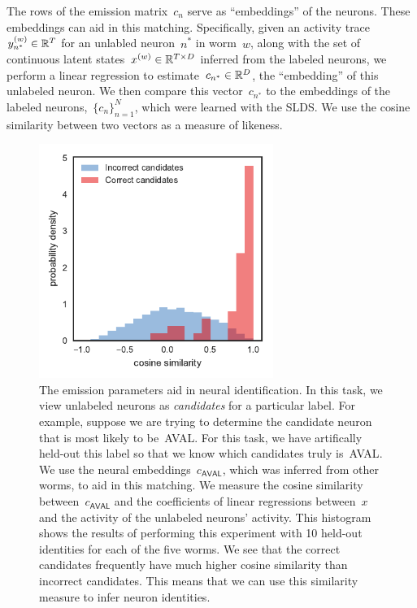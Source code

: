 \documentclass{article}
\begin{document}
The rows of the emission matrix~$c_n$ serve as ``embeddings'' of the
neurons. These embeddings can aid in this matching.  Specifically,
given an activity trace~$y^{(w)}_{n^*} \in \mathbb{R}^T$ for an unlabled
neuron~$n^*$ in worm~$w$, along with the set of continuous latent
states~$x^{(w)} \in \mathbb{R}^{T \times D}$ inferred from the labeled
neurons, we perform a linear regression to
estimate~$c_{n^*} \in \mathbb{R}^D$, the ``embedding'' of this unlabeled
neuron.  We then compare this vector~$c_{n^*}$ to the embeddings of
the labeled neurons,~$\{c_n\}_{n=1}^N$, which were learned with the
SLDS.  We use the cosine similarity between two vectors as a measure
of likeness.


\begin{figure}[h]
\centering%
\includegraphics[width=3in]{figures/lds/similarity_comparison} 
\caption{The emission parameters aid in neural identification.  In
  this task, we view unlabeled neurons as \emph{candidates} for a
  particular label. For example, suppose we are trying to determine
  the candidate neuron that is most likely to be~\textsf{AVAL}. For
  this task, we have artifically held-out this label so that we know
  which candidates truly is~\textsf{AVAL}. We use the neural
  embeddings~$c_{\mathsf{AVAL}}$, which was inferred from other worms,
  to aid in this matching.  We measure the cosine similarity
  between~$c_{\mathsf{AVAL}}$ and the coefficients of linear
  regressions between~$x$ and the activity of the unlabeled neurons'
  activity. This histogram shows the results of performing this
  experiment with 10 held-out identities for each of the five worms.
  We see that the correct candidates frequently have much higher
  cosine similarity than incorrect candidates.  This means that we can
  use this similarity measure to infer neuron identities.  }
\label{fig:neuron_id}
\end{figure}
\end{document}
